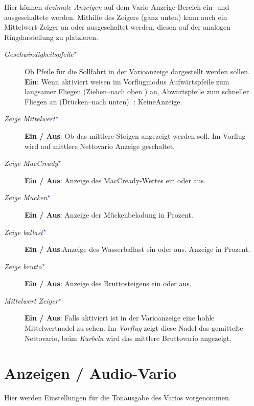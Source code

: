 Hier können \textsl{dezimale Anzeigen} auf dem Vario-Anzeige-Bereich  ein- und ausgeschaltete werden.
Mithilfe des Zeigers (ganz unten) kann auch ein Mittelwert-Zeiger an oder ausgeschaltet werden,
 diesen auf der analogen Ringdarstellung zu platzieren.
\begin{description}
\item[\textit{Geschwindigkeitspfeile$^{\textcolor{blue}{\star}}$}]  \label{conf:variogauge} Ob Pfeile für die Sollfahrt  in der Varioanzeige dargestellt werden sollen.\\
{\bf Ein}: Wenn aktiviert weisen im Vorflugmodus  Aufwärtspfeile zum langsamer Fliegen (Ziehen--nach oben ) an,  Abwärtspfeile zum schneller Fliegen an (Drücken--nach unten).
:  KeineAnzeige.\\
\item[\textit{Zeige Mittelwert$^{\textcolor{blue}{\star}}$}]  {\bf Ein / Aus}: Ob das mittlere Steigen angezeigt werden soll.
Im Vorflug wird auf mittlere Nettovario Anzeige geschaltet.
\item[\textit{Zeige MacCready$^{\textcolor{blue}{\star}}$}] {\bf Ein / Aus}: Anzeige des  MacCready-Wertes  ein oder aus.
\item[\textit{Zeige Mücken$^{\textcolor{blue}{\star}}$}] {\bf Ein / Aus}: Anzeige der Mückenbeladung in Prozent.
\item[\textit{Zeige ballast$^{\textcolor{blue}{\star}}$}] {\bf Ein / Aus}:Anzeige des Wasserballast ein oder aus. Anzeige in Prozent.
\item[\textit{Zeige brutto$^{\textcolor{blue}{\star}}$}] {\bf Ein / Aus}: Anzeige des Bruttosteigens ein oder aus.
\item[\textit{Mittelwert Zeiger$^{\textcolor{blue}{\star}}$}] {\bf Ein / Aus}: Falls aktiviert ist in der Varioanzeige eine hohle Mittelwertnadel zu sehen.
Im \textsl{Vorflug} zeigt diese Nadel das gemittelte Nettovario,
beim \textsl{Kurbeln} wird das mittlere Bruttovario angezeigt.
\end{description}

\section{Anzeigen / Audio-Vario}\label{sec:audiovario-gauge}

Hier werden Einstellungen für die Tonausgabe des Varios vorgenommen.
\label{conf:audiovariogauge}

